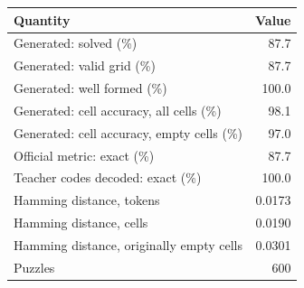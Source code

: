 \begin{tabular}{lr}
\toprule
Quantity & Value \\
\midrule
Generated: solved (\%) & 87.7 \\
Generated: valid grid (\%) & 87.7 \\
Generated: well formed (\%) & 100.0 \\
Generated: cell accuracy, all cells (\%) & 98.1 \\
Generated: cell accuracy, empty cells (\%) & 97.0 \\
Official metric: exact (\%) & 87.7 \\
Teacher codes decoded: exact (\%) & 100.0 \\
Hamming distance, tokens & 0.0173 \\
Hamming distance, cells & 0.0190 \\
Hamming distance, originally empty cells & 0.0301 \\
Puzzles & 600 \\
\bottomrule
\end{tabular}
